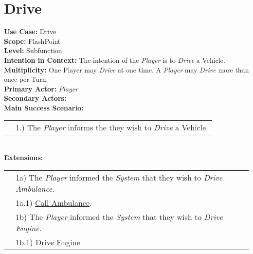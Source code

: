 \documentclass{article}
\begin{document}
	
	\section*{Drive}
	\textbf{Use Case:} Drive\\
	\textbf{Scope:} FlashPoint\\
	\textbf{Level:} Subfunction\\
	\textbf{Intention in Context:} The intention of the \textit{Player} is to \textit{Drive} a Vehicle.\\
	\textbf{Multiplicity: } One Player may \textit{Drive} at one time. A \textit{Player} may \textit{Drive} more than once per Turn.\\
	\textbf{Primary Actor:} \textit{Player}\\
	\textbf{Secondary Actors:}\\
	\textbf{Main Success Scenario:}\\
	\begin{tabular}{l l}
		&1.) The \textit{Player} informs the \text{System} they wish to \textit{Drive} a Vehicle. \\
	\end{tabular}\\
	\textbf{Extensions: } \\
	\begin{tabular}{l l}
		&1a) The \textit{Player} informed the \textit{System} that they wish to \textit{Drive Ambulance}. \\
		&\qquad1a.1) \underline{Call Ambulance}.\\
		&1b) The \textit{Player} informed the \textit{System} that they wish to \textit{Drive  Engine.}\\
		&\qquad1b.1) \underline{Drive Engine}\\
	\end{tabular}\\
	
\end{document}
